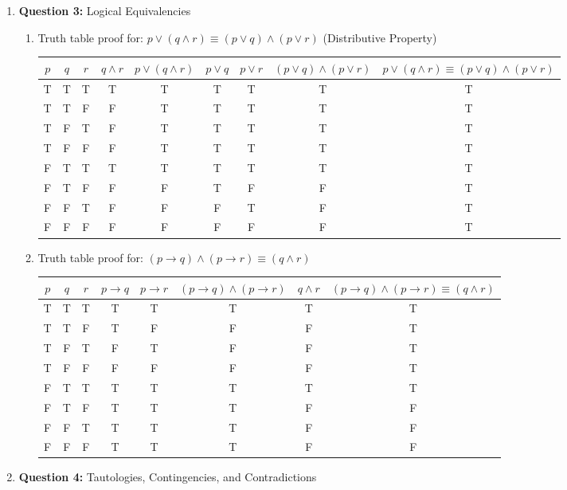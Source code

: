 \documentclass[11pt]{article}
\begin{document}
\begin{enumerate}
\item
\textbf{Question 3:}
Logical Equivalencies

\begin{enumerate}[label=(\alph*)]
\item
Truth table proof for: $p \vee (q \wedge r) \equiv (p \vee q) \wedge (p \vee r)$ (Distributive Property) \\
\begin{tabular}{|c|c|c|c|c|c|c|c|c|} \hline
$p$ & $q$ & $r$ & $q \wedge r$ & $p \vee (q \wedge r)$ & $p \vee q$ & $p \vee r$ & $(p \vee q) \wedge (p \vee r)$ & $p \vee (q \wedge r) \equiv (p \vee q) \wedge (p \vee r)$ \\
\hline
T&T&T&T&T&T&T&T&T \\ %
\hline
T&T&F&F&T&T&T&T&T \\
\hline
T&F&T&F&T&T&T&T&T \\ 
\hline
T&F&F&F&T&T&T&T&T \\
\hline
F&T&T&T&T&T&T&T&T \\
\hline
F&T&F&F&F&T&F&F&T \\
\hline
F&F&T&F&F&F&T&F&T \\
\hline
F&F&F&F&F&F&F&F&T \\
\hline
\end{tabular}
\item 
Truth table proof for: $(p \rightarrow q) \wedge (p \rightarrow r) \equiv (q \wedge r)$ \\
\begin{tabular}{|c|c|c|c|c|c|c|c|} \hline
$p$ & $q$ & $r$ & $p \rightarrow q$ & $p \rightarrow r$ & $(p \rightarrow q) \wedge (p \rightarrow r)$ & $q \wedge r$ & $(p \rightarrow q) \wedge (p \rightarrow r) \equiv (q \wedge r)$ \\
\hline
T&T&T&T&T&T&T&T \\
\hline
T&T&F&T&F&F&F&T \\
\hline
T&F&T&F&T&F&F&T \\
\hline
T&F&F&F&F&F&F&T \\
\hline
F&T&T&T&T&T&T&T \\
\hline
F&T&F&T&T&T&F&F \\
\hline
F&F&T&T&T&T&F&F \\
\hline
F&F&F&T&T&T&F&F \\
\hline
\end{tabular}
\end{enumerate}

\item
\textbf{Question 4:}
Tautologies, Contingencies, and Contradictions\\


\end{enumerate}
\end{document}
